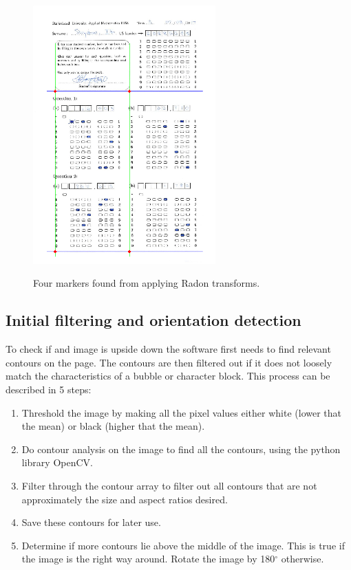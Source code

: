 \begin{figure}
  \centering
  \includegraphics[width=7cm]{RadonResults}\\
  \caption{Four markers found from applying Radon transforms.}
  \label{fig:radonResults}
\end{figure}

\subsection{Initial filtering and orientation detection}
\label{sec:InitImageFilter}

To check if and image is upside down the software first needs to find relevant contours on the page. The contours are then filtered out if it does not loosely match the characteristics of a bubble or character block. This process can be described in 5 steps:

\begin{enumerate}
\item Threshold the image by making all the pixel values either white (lower that the mean) or black (higher that the mean).
\item Do contour analysis on the image to find all the contours, using the python library OpenCV.
\item Filter through the contour array to filter out all contours that are not approximately the size and aspect ratios desired.
\item Save these contours for later use.
\item Determine if more contours lie above the middle of the image. This is true if the image is the right way around. Rotate the image by 180$^{\circ}$ otherwise.
\end{enumerate}

